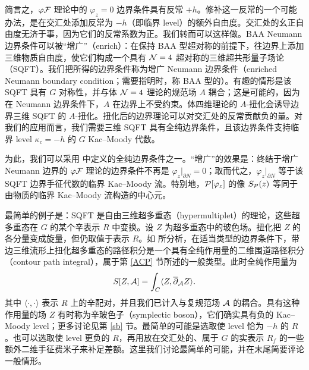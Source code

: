 简言之，$\varphi\cF$ 理论中的 $\varphi_z=0$ 边界条件具有反常 $+h$。修补这一反常的一个可能办法，是在交汇处添加反常为 $-h$（即临界 level）的额外自由度。交汇处的幺正自由度无济于事，因为它们的反常系数为正。我们转而可以这样做。BAA Neumann 边界条件可以被“增广”（enrich）：在保持 BAA 型超对称的前提下，往边界上添加三维物质自由度，使它们构成一个具有 $\N=4$ 超对称的三维超共形量子场论（SQFT）。我们把所得的边界条件称为增广 Neumann 边界条件（enriched Neumann boundary condition；需要指明时，称 BAA 型的）。有趣的情形是该 SQFT 具有 $G$ 对称性，并与体 ${\cal N}=4$ 理论的规范场 $A$ 耦合；这是可能的，因为在 Neumann 边界条件下，$A$ 在边界上不受约束。体四维理论的 $A$-扭化会诱导边界三维 SQFT 的 $A$-扭化。扭化后的边界理论可以对交汇处的反常贡献负的量。对我们的应用而言，我们需要三维 SQFT 具有全纯边界条件，且该边界条件支持临界 level $\kappa_c=-h$ 的 $G$ Kac–Moody 代数。

为此，我们可以采用 \cite{Costello:2018fnz} 中定义的全纯边界条件之一。“增广”的效果是：终结于增广 Neumann 边界的 $\varphi\cF$ 理论的边界条件不再是 $\varphi_z|_{\partial N}=0$；取而代之，$\varphi_z|_{\partial N}$ 等于该 SQFT 边界手征代数的临界 Kac–Moody 流。特别地，$\P[\varphi_z]$ 的像 $S_{\P}(z)$ 等同于由物质的临界 Kac–Moody 流构造的中心元。

最简单的例子是：SQFT 是自由三维超多重态（hypermultiplet）的理论，这些超多重态在 $G$ 的某个辛表示 $R$ 中变换。设 $Z$ 为超多重态中的玻色场。扭化把 $Z$ 的各分量变成旋量，但仍取值于表示 $R$。如 \cite{Gaiotto:2016hvd} 所分析，在适当类型的边界条件下，带边三维流形上扭化超多重态的路径积分是一个具有全纯作用量的二维围道路径积分（contour path integral），属于第 \ref{ACP} 节所述的一般类型。此时全纯作用量为
\begin{equation}
S[Z,\cA] = \int_C \langle Z, \bar \partial_\cA Z \rangle .
\end{equation} 
其中 $\langle \cdot,\cdot \rangle$ 表示 $R$ 上的辛配对，并且我们已计入与复规范场 $\cA$ 的耦合。具有这种作用量的场 $Z$ 有时称为辛玻色子（symplectic boson），它们确实具有负的 Kac–Moody level；更多讨论见第 \ref{sb} 节。最简单的可能是选取使 level 恰为 $-h$ 的 $R$。也可以选取使 level 更负的 $R$，再用放在交汇处的、属于 $G$ 的实表示 $R_f$ 的一些额外二维手征费米子来补足差额。这里我们讨论最简单的可能，并在末尾简要评论一般情形。


